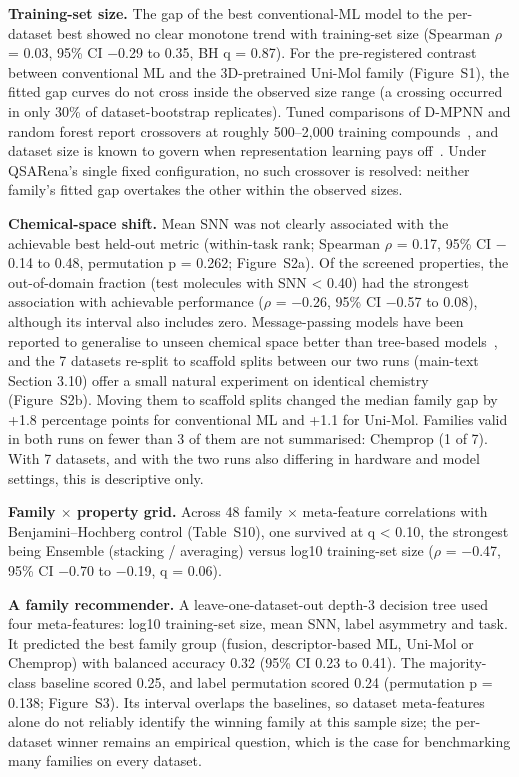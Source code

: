 \documentclass[11pt,a4paper]{article}
\begin{document}
\textbf{Training-set size.} The gap of the best conventional-ML model to the per-dataset best showed no clear monotone trend with training-set size (Spearman $\rho$ = 0.03, 95\% CI $-$0.29 to 0.35, BH q = 0.87). For the pre-registered contrast between conventional ML and the 3D-pretrained Uni-Mol family (Figure~S1), the fitted gap curves do not cross inside the observed size range (a crossing occurred in only 30\% of dataset-bootstrap replicates). Tuned comparisons of D-MPNN and random forest report crossovers at roughly 500--2,000 training compounds~\cite{chen2025datascaling}, and dataset size is known to govern when representation learning pays off~\cite{deng2023systematic}. Under QSARena's single fixed configuration, no such crossover is resolved: neither family's fitted gap overtakes the other within the observed sizes.

\textbf{Chemical-space shift.} Mean SNN was not clearly associated with the achievable best held-out metric (within-task rank; Spearman $\rho$ = 0.17, 95\% CI $-$0.14 to 0.48, permutation p = 0.262; Figure~S2a). Of the screened properties, the out-of-domain fraction (test molecules with SNN < 0.40) had the strongest association with achievable performance ($\rho$ = $-$0.26, 95\% CI $-$0.57 to 0.08), although its interval also includes zero. Message-passing models have been reported to generalise to unseen chemical space better than tree-based models~\cite{yang2019analyzing}, and the 7 datasets re-split to scaffold splits between our two runs (main-text Section 3.10) offer a small natural experiment on identical chemistry (Figure~S2b). Moving them to scaffold splits changed the median family gap by +1.8 percentage points for conventional ML and +1.1 for Uni-Mol. Families valid in both runs on fewer than 3 of them are not summarised: Chemprop (1 of 7). With 7 datasets, and with the two runs also differing in hardware and model settings, this is descriptive only.

\textbf{Family $\times$ property grid.} Across 48 family $\times$ meta-feature correlations with Benjamini--Hochberg control (Table~S10), one survived at q < 0.10, the strongest being Ensemble (stacking / averaging) versus log10 training-set size ($\rho$ = $-$0.47, 95\% CI $-$0.70 to $-$0.19, q = 0.06).

\textbf{A family recommender.} A leave-one-dataset-out depth-3 decision tree used four meta-features: log10 training-set size, mean SNN, label asymmetry and task. It predicted the best family group (fusion, descriptor-based ML, Uni-Mol or Chemprop) with balanced accuracy 0.32 (95\% CI 0.23 to 0.41). The majority-class baseline scored 0.25, and label permutation scored 0.24 (permutation p = 0.138; Figure~S3). Its interval overlaps the baselines, so dataset meta-features alone do not reliably identify the winning family at this sample size; the per-dataset winner remains an empirical question, which is the case for benchmarking many families on every dataset.
\end{document}
